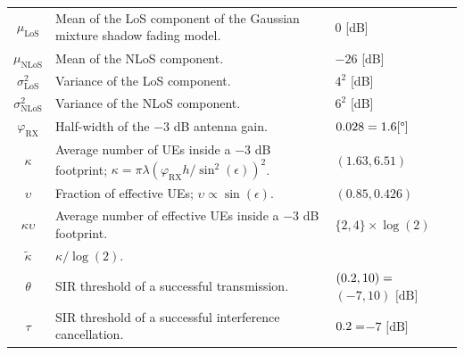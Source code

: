 \documentclass[lettersize,journal]{IEEEtran}
\begin{document}
\begin{table}
\begin{center}
\begin{tabular}{c|p{4.5cm}|p{1.9cm}}
      $\mu_{\text{LoS}}$& Mean of the LoS component of the Gaussian mixture shadow fading model. & $0$ [dB] \\
      $\mu_{\text{NLoS}}$& Mean of the NLoS component. & $-26$ [dB] \\
      $\sigma^2_{\text{LoS}}$& Variance of the LoS component. & $4^2$ [dB] \\
      $\sigma^2_{\text{NLoS}}$& Variance of the NLoS component. & $6^2$ [dB] \\
      $\varphi_{\text{RX}}$ & Half-width of the $-3$ dB antenna gain.&$0.028= 1.6 [\degree] \hfill $ \\      
      $\kappa$& Average number of UEs inside a $-3$ dB footprint; $\kappa =\pi \lambda \left({\varphi_{\text{RX}}}h/{\sin^2(\epsilon)}\right)^2$.& $(1.63,6.51)$ \\
      $\upsilon$&Fraction of effective UEs; $\upsilon \propto \sin(\epsilon)$. &$(0.85,0.426)$ \\      
      $\kappa \upsilon$& Average number of effective UEs inside a $-3$ dB footprint.& $\{2,4\}\times \log(2)$ \\
      $\tilde{\kappa} $& $\kappa/\log(2)$. \\
      $\theta$ & SIR threshold of a successful transmission.&$(0.2,10)=\hfill$  \break  $(-7,10) \text{ [dB]}$ \\
      $\tau$ & SIR threshold of a successful interference cancellation.& $0.2=\hfill$\break $-7\text{ [dB]}$\\
     \bottomrule
    \end{tabular}
  \end{center}
\end{table}   
\end{document}
